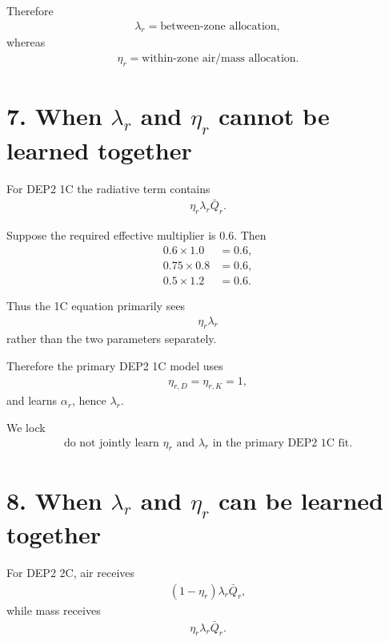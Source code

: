 \documentclass[11pt]{article}
\begin{document}
Therefore
\begin{align}
\boxed{\lambda_r=\text{between-zone allocation},}
\tag{P4.31}
\end{align}
whereas
\begin{align}
\boxed{\eta_r=\text{within-zone air/mass allocation}.}
\tag{P4.32}
\end{align}

\section*{7. When \(\lambda_r\) and \(\eta_r\) cannot be learned together}

For DEP2 1C the radiative term contains
\begin{align}
\eta_r\lambda_r\bar Q_r.
\end{align}

Suppose the required effective multiplier is \(0.6\). Then
\begin{align}
0.6\times1.0&=0.6,\\
0.75\times0.8&=0.6,\\
0.5\times1.2&=0.6.
\end{align}

Thus the 1C equation primarily sees
\begin{align}
\boxed{\eta_r\lambda_r}
\tag{P4.33}
\end{align}
rather than the two parameters separately.

Therefore the primary DEP2 1C model uses
\begin{align}
\boxed{\eta_{r,D}=\eta_{r,K}=1,}
\tag{P4.34}
\end{align}
and learns \(\alpha_r\), hence \(\lambda_r\).

We lock
\begin{align}
\boxed{
\text{do not jointly learn }\eta_r\text{ and }\lambda_r
\text{ in the primary DEP2 1C fit.}
}
\tag{P4.35}
\end{align}

\section*{8. When \(\lambda_r\) and \(\eta_r\) can be learned together}

For DEP2 2C, air receives
\begin{align}
(1-\eta_r)\lambda_r\bar Q_r,
\end{align}
while mass receives
\begin{align}
\eta_r\lambda_r\bar Q_r.
\end{align}
\end{document}
